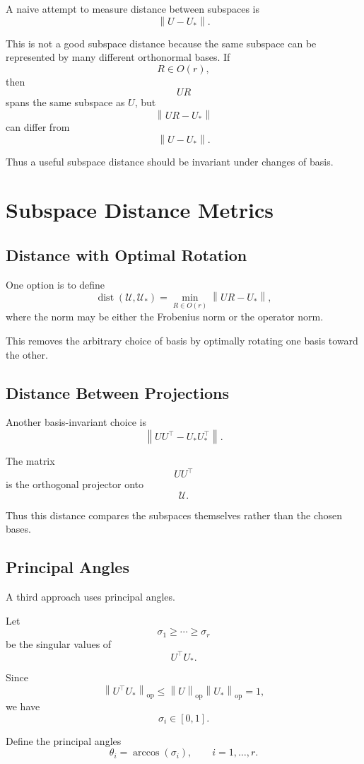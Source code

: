 \documentclass[12pt,oneside]{book}
\numberwithin{equation}{section}
\theoremstyle{definition}
\theoremstyle{plain}
\theoremstyle{remark}
\newcommand{\norm}[1]{\left\lVert #1 \right\rVert}
\begin{document}
A naive attempt to measure distance between subspaces is
\[
\norm{U-U_*}.
\]

This is not a good subspace distance because the same subspace can be represented by many different orthonormal bases. If
\[
R\in O(r),
\]
then
\[
UR
\]
spans the same subspace as $U$, but
\[
\norm{UR-U_*}
\]
can differ from
\[
\norm{U-U_*}.
\]

Thus a useful subspace distance should be invariant under changes of basis.

\section{Subspace Distance Metrics}

\subsection{Distance with Optimal Rotation}

One option is to define
\[
\operatorname{dist}(\mathcal{U},\mathcal{U}_*)
=
\min_{R\in O(r)}
\norm{UR-U_*},
\]
where the norm may be either the Frobenius norm or the operator norm.

This removes the arbitrary choice of basis by optimally rotating one basis toward the other.

\subsection{Distance Between Projections}

Another basis-invariant choice is
\[
\norm{UU^\top-U_*U_*^\top}.
\]

The matrix
\[
UU^\top
\]
is the orthogonal projector onto
\[
\mathcal{U}.
\]

Thus this distance compares the subspaces themselves rather than the chosen bases.

\subsection{Principal Angles}

A third approach uses principal angles.

Let
\[
\sigma_1\geq \cdots \geq \sigma_r
\]
be the singular values of
\[
U^\top U_*.
\]

Since
\[
\norm{U^\top U_*}_{\mathrm{op}}
\leq
\norm{U}_{\mathrm{op}}\norm{U_*}_{\mathrm{op}}
=
1,
\]
we have
\[
\sigma_i\in[0,1].
\]

Define the principal angles
\[
\theta_i=\arccos(\sigma_i),
\qquad
i=1,\dots,r.
\]
\end{document}
